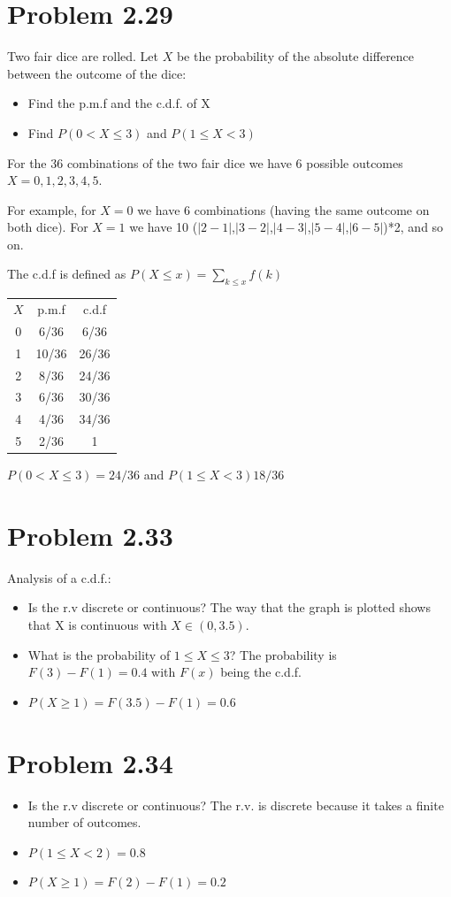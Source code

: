 \documentclass[10pt]{article}
\begin{document}
\section{Problem 2.29}
Two fair dice are rolled. Let $X$ be the probability of the absolute difference between
the outcome of the dice:
\begin{itemize}
    \item Find the p.m.f and the c.d.f. of X
    \item Find $P(0<X\leq 3)$ and $P(1\leq X <3)$
\end{itemize}

For the 36 combinations of the two fair dice we have 6 possible outcomes $X=0,1,2,3,4,5$.

For example, for $X=0$ we have 6 combinations (having the same outcome on both dice). 
For $X=1$ we have 10 ($|2-1|$,$|3-2|$,$|4-3|$,$|5-4|$,$|6-5|$)*2, and so on.

The c.d.f is defined as $P(X\leq x)=\sum_{k\leq x} f(k) $

\begin{tabular}{c |c | c }

   $X$    & p.m.f  & c.d.f \\ 
    0     & 6/36   & 6/36  \\ 
    1     & 10/36  & 26/36 \\
    2     & 8/36   & 24/36 \\ 
    3     & 6/36   & 30/36 \\
    4     & 4/36   & 34/36 \\
    5     & 2/36   & 1     \\
\end{tabular}

$P(0<X\leq 3) = 24/36$ and $P(1\leq X <3)18/36$


\section{Problem 2.33}
Analysis of a c.d.f.:

\begin{itemize}
    \item Is the r.v discrete or continuous? The way that the 
          graph is plotted shows that X is continuous with $X \in (0,3.5)$.
    \item What is the probability of $1\leq X \leq 3$? The probability is 
          $F(3)-F(1)= 0.4$ with $F(x)$ being the c.d.f.
    \item $P(X\geq1)=F(3.5)-F(1)=0.6$ 
\end{itemize}


\section{Problem 2.34}
\begin{itemize}
    \item Is the r.v discrete or continuous?  The r.v. is discrete
    because it takes a finite number of outcomes.
    \item $P(1\leq X<2)=0.8$
    \item $P(X\geq 1)=F(2)-F(1)=0.2$

\end{itemize}
\end{document}
